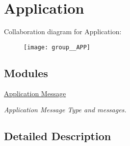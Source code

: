 \hypertarget{group__APP}{}\section{Application}
\label{group__APP}
Collaboration diagram for Application\+:
\nopagebreak
\begin{figure}[H]
\begin{center}
\leavevmode
\texttt{[image: group\_\_APP]}
\end{center}
\end{figure}
\subsection*{Modules}
\begin{DoxyCompactItemize}
\item 
\hyperlink{group__APP__MSG}{Application Message}
\begin{DoxyCompactList}\small\item\em Application Message Type and messages. \end{DoxyCompactList}\end{DoxyCompactItemize}


\subsection{Detailed Description}
